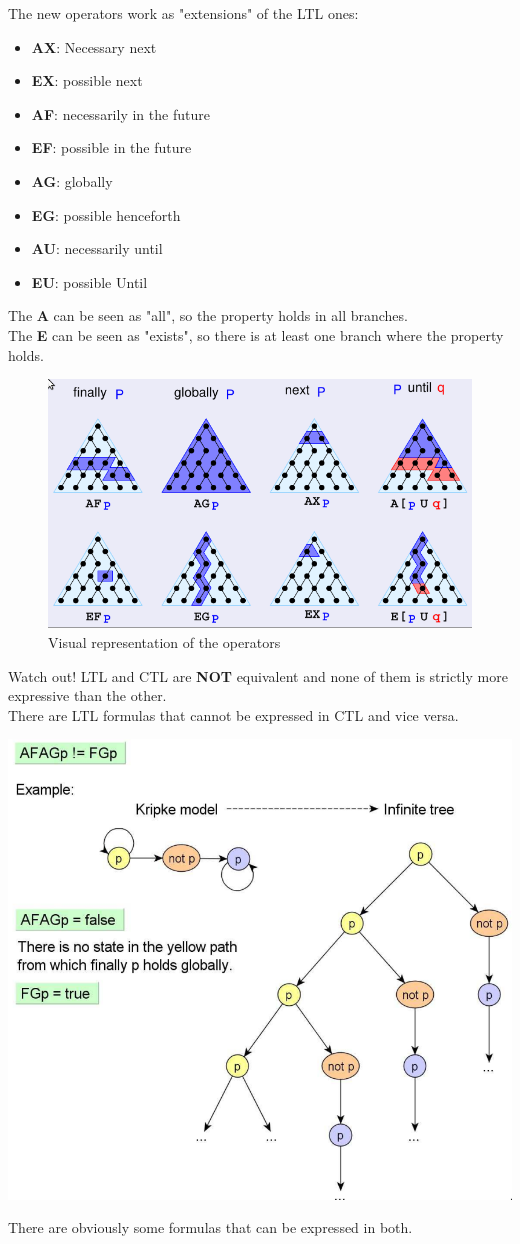 \documentclass{article}
\begin{document}
The new operators work as "extensions" of the LTL ones:
\begin{itemize}
    \item \textbf{AX}: Necessary next
    \item \textbf{EX}: possible next
    \item \textbf{AF}: necessarily in the future
    \item \textbf{EF}: possible in the future
    \item \textbf{AG}: globally
    \item \textbf{EG}: possible henceforth
    \item \textbf{AU}: necessarily until
    \item \textbf{EU}: possible Until
\end{itemize} 
The \textbf{A} can be seen as "all", so the property holds in all branches.\\
The \textbf{E} can be seen as "exists", so there is at least one branch where the property holds.

\begin{figure}[h]
    \centering
    \includegraphics[width=0.5\linewidth]{images/CTLtrees.png}
    \caption{Visual representation of the operators}
\end{figure}

\begin{callout}[red]{Watch out!}
    LTL and CTL are \textbf{NOT} equivalent and none of them is strictly more expressive than the other.\\
    There are LTL formulas that cannot be expressed in CTL and vice versa.
    \begin{center}
        \includegraphics[width=0.5\linewidth]{images/AFAGvsFG.png}
    \end{center}
    There are obviously some formulas that can be expressed in both.
\end{callout}
\end{document}
